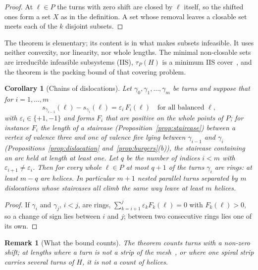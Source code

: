\documentclass[11pt,a4paper]{article}
\newtheorem{corollary}{Corollary}
\newtheorem{remark}{Remark}
\newcommand{\shift}{s}
\newcommand{\lean}[1]{\texttt{\detokenize{#1}}}
\newenvironment{evidence}[3][]{}{}
\begin{document}
\begin{proof}
At $\ell \in P$ the turns with zero shift are closed by $\ell$ itself, so the
shifted ones form a set $X$ as in the definition. A set whose removal leaves a
closable set meets each of the $k$ disjoint subsets.
\end{proof}

The theorem is elementary; its content is in what makes subsets infeasible.
It uses neither convexity, nor linearity, nor whole lengths. The minimal
non-closable sets are irreducible infeasible subsystems (IIS), $\tau_P(H)$ is
a minimum IIS cover~\cite{parker1996iis,amaldi2003maxfs}, and the theorem is
the packing bound of that covering problem.

\begin{evidence}{core}{\lean{sign_change_between}, \lean{chain_of_dislocations}; assumed: the identities between consecutive shifts}
\begin{corollary}[Chains of dislocations]\label{cor:chain}
Let $\gamma_0, \gamma_1, \dots, \gamma_m$ be turns and suppose that for $i = 1,
\dots, m$
\[
  \shift_{\gamma_{i-1}}(\ell) - \shift_{\gamma_i}(\ell) = \varepsilon_i\,
  F_i(\ell) \quad \text{for all balanced } \ell,
\]
with $\varepsilon_i \in \{+1, -1\}$ and forms $F_i$ that are positive on the
whole points of $P$; for instance $F_i$ the length of a staircase
(Proposition~\ref{prop:staircase}) between a vertex of valence three and one of
valence five lying between $\gamma_{i-1}$ and $\gamma_i$
(Propositions~\ref{prop:dislocation} and~\ref{prop:burgers}(b)), the
staircase containing an arc held at length at least one. Let $q$ be the number
of indices $i < m$ with $\varepsilon_{i+1} \neq \varepsilon_i$. Then for every
whole $\ell \in P$ at most $q + 1$ of the turns $\gamma_i$ are rings: at least
$m - q$ are helices. In particular $m + 1$ nested parallel turns separated by
$m$ dislocations whose staircases all climb the same way leave at least $m$
helices.
\end{corollary}
\end{evidence}

\begin{proof}
If $\gamma_i$ and $\gamma_j$, $i < j$, are rings, $\sum_{k=i+1}^{j}
\varepsilon_k F_k(\ell) = 0$ with $F_k(\ell) > 0$, so a change of sign lies
between $i$ and $j$; between two consecutive rings lies one of its own.
\end{proof}

\begin{remark}[What the bound counts]
The theorem counts turns with a non-zero shift; at lengths where a turn is not
a strip of the mesh~\cite[Prop.~2]{gardent2026loops}, or where one spiral
strip carries several turns of $H$, it is not a count of helices.
\end{remark}
\end{document}

